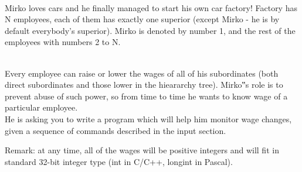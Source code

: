  

Mirko loves cars and he finally managed to start his own car factory! Factory has N employees, each of them has exactly one superior (except Mirko - he is by default everybody's superior). Mirko is denoted by number 1, and the rest of the employees with numbers 2 to N.


\\Every employee can raise or lower the wages of all of his subordinates (both direct subordinates and those lower in the hieararchy tree). Mirko‟s role is to prevent abuse of such power, so from time to time he wants to know wage of a particular employee.
\\He is asking you to write a program which will help him monitor wage changes, given a sequence of commands described in the input section.

Remark: at any time, all of the wages will be positive integers and will fit in standard 32-bit integer type (int in C/C++, longint in Pascal).

\
